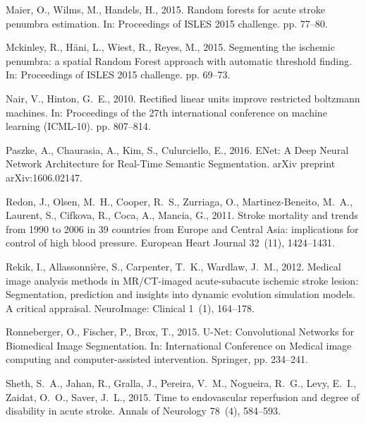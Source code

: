 \documentclass[letterpaper,final,authoryear,3p,times,twocolumn]{elsarticle}
\begin{document}
\begin{thebibliography}{36}
Maier, O., Wilms, M., Handels, H., 2015{}. {Random forests for
  acute stroke penumbra estimation}. In: Proceedings of ISLES 2015 challenge.
  pp. 77--80.

Mckinley, R., H{\"{a}}ni, L., Wiest, R., Reyes, M., 2015. {Segmenting the
  ischemic penumbra: a spatial Random Forest approach with automatic threshold
  finding}. In: Proceedings of ISLES 2015 challenge. pp. 69--73.

Nair, V., Hinton, G.~E., 2010. {Rectified linear units improve restricted
  boltzmann machines}. In: Proceedings of the 27th international conference on
  machine learning (ICML-10). pp. 807--814.

Paszke, A., Chaurasia, A., Kim, S., Culurciello, E., 2016. {ENet: A Deep Neural
  Network Architecture for Real-Time Semantic Segmentation}. arXiv preprint
  arXiv:1606.02147.

Redon, J., Olsen, M.~H., Cooper, R.~S., Zurriaga, O., Martinez-Beneito, M.~A.,
  Laurent, S., Cifkova, R., Coca, A., Mancia, G., 2011. {Stroke mortality and
  trends from 1990 to 2006 in 39 countries from Europe and Central Asia:
  implications for control of high blood pressure}. European Heart Journal
  32~(11), 1424--1431.

Rekik, I., Allassonni{\`{e}}re, S., Carpenter, T.~K., Wardlaw, J.~M., 2012.
  {Medical image analysis methods in MR/CT-imaged acute-subacute ischemic
  stroke lesion: Segmentation, prediction and insights into dynamic evolution
  simulation models. A critical appraisal}. NeuroImage: Clinical 1~(1),
  164--178.

Ronneberger, O., Fischer, P., Brox, T., 2015. {U-Net: Convolutional Networks
  for Biomedical Image Segmentation}. In: International Conference on Medical
  image computing and computer-assisted intervention. Springer, pp. 234--241.

Sheth, S.~A., Jahan, R., Gralla, J., Pereira, V.~M., Nogueira, R.~G., Levy,
  E.~I., Zaidat, O.~O., Saver, J.~L., 2015. {Time to endovascular reperfusion
  and degree of disability in acute stroke}. Annals of Neurology 78~(4),
  584--593.


\end{thebibliography}
\end{document}
